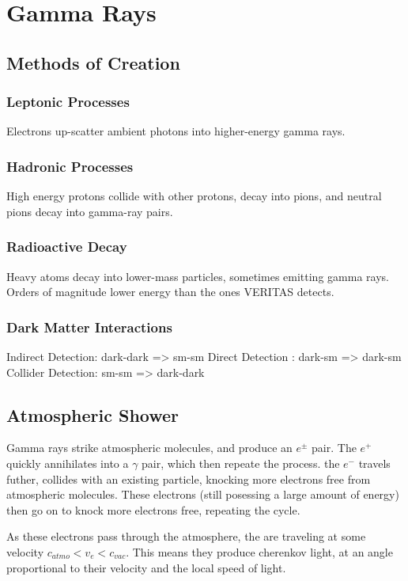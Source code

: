 \cleartooddpage[\thispagestyle{empty}]
\chapter{Gamma Rays}

\section{Methods of Creation}

\subsection{Leptonic Processes}
Electrons up-scatter ambient photons into higher-energy gamma rays.

\subsection{Hadronic Processes}
High energy protons collide with other protons, decay into pions, and neutral pions decay into gamma-ray pairs.

\subsection{Radioactive Decay}
Heavy atoms decay into lower-mass particles, sometimes emitting gamma rays.
Orders of magnitude lower energy than the ones VERITAS detects.

\subsection{Dark Matter Interactions}
Indirect Detection: dark-dark => sm-sm
Direct Detection  : dark-sm => dark-sm
Collider Detection: sm-sm => dark-dark


\section{Atmospheric Shower}

Gamma rays strike atmospheric molecules, and produce an $e^\pm$ pair.
The $e^+$ quickly annihilates into a $\gamma$ pair, which then repeate the process.
the $e^-$ travels futher, collides with an existing particle, knocking more electrons free from atmospheric molecules.
These electrons (still posessing a large amount of energy) then go on to knock more electrons free, repeating the cycle.

As these electrons pass through the atmosphere, the are traveling at some velocity $c_{atmo}<v_e<c_{vac}$.
This means they produce cherenkov light, at an angle proportional to their velocity and the local speed of light.


